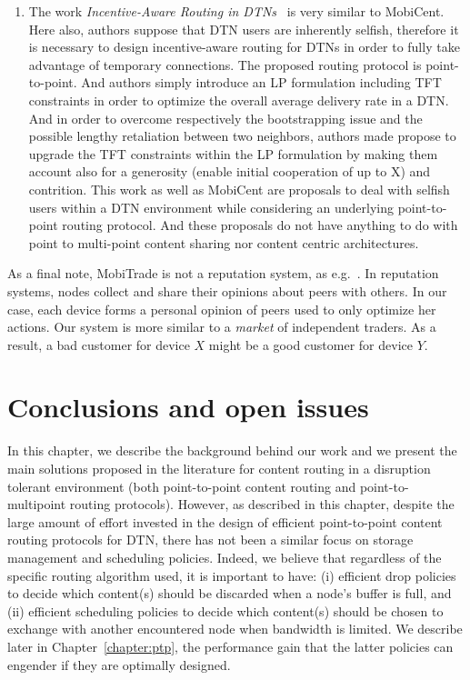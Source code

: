 \begin{enumerate}
\item The work \emph{Incentive-Aware Routing in DTNs}~\cite{IADTN} is very similar to MobiCent. Here also, authors suppose that DTN users are inherently selfish, therefore it is necessary to design incentive-aware routing for DTNs in order to fully take advantage of temporary connections. The proposed routing protocol is point-to-point. And authors simply introduce an LP formulation including TFT constraints in order to optimize the overall average delivery rate in a DTN. And in order to overcome respectively the bootstrapping issue and the possible lengthy retaliation between two neighbors, authors made propose to upgrade the TFT constraints within the LP formulation by making them account also for a generosity (enable initial cooperation of up to X) and contrition. This work as well as MobiCent are proposals to deal with selfish users within a DTN environment while considering an underlying point-to-point routing protocol. And these proposals do not have anything to do with point to multi-point content sharing nor content centric architectures.

\end{enumerate}

As a final note, MobiTrade is not a reputation system, as e.g.~\cite{Reputation}. In reputation systems, nodes collect and share their opinions about peers with others. In our case, each device forms a personal opinion of peers used to only optimize her actions. Our system is more similar to a \emph{market} of independent traders. As a result, a bad customer for device $X$ might be a good customer for device $Y$.

\section{Conclusions and open issues}

In this chapter, we describe the background behind our work and we present the main solutions proposed in the literature for content routing in a disruption tolerant environment (both point-to-point content routing and point-to-multipoint routing protocols). However, as described in this chapter, despite the large amount of effort invested in the design of efficient point-to-point content routing protocols for DTN, there has not been a similar focus on storage management and scheduling policies. Indeed, we believe that regardless of the specific routing algorithm used, it is important to have: (i) efficient drop policies to decide which content(s) should be discarded when a node's buffer is full, and (ii) efficient scheduling policies to decide which content(s) should be chosen to exchange with another encountered node when bandwidth is limited. We describe later in Chapter~\ref{chapter:ptp}, the performance gain that the latter policies can engender if they are optimally designed. 

